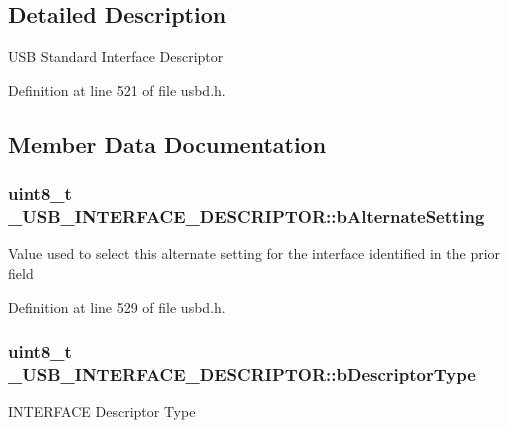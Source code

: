 \subsection{Detailed Description}
U\+SB Standard Interface Descriptor 

Definition at line 521 of file usbd.\+h.



\subsection{Member Data Documentation}
\subsubsection[{\texorpdfstring{b\+Alternate\+Setting}{bAlternateSetting}}]{\setlength{\rightskip}{0pt plus 5cm}uint8\+\_\+t \+\_\+\+U\+S\+B\+\_\+\+I\+N\+T\+E\+R\+F\+A\+C\+E\+\_\+\+D\+E\+S\+C\+R\+I\+P\+T\+O\+R\+::b\+Alternate\+Setting}\hypertarget{struct__USB__INTERFACE__DESCRIPTOR_aa596036a18b317c3dbeb9ea417938a43}{}\label{struct__USB__INTERFACE__DESCRIPTOR_aa596036a18b317c3dbeb9ea417938a43}
Value used to select this alternate setting for the interface identified in the prior field 

Definition at line 529 of file usbd.\+h.

\subsubsection[{\texorpdfstring{b\+Descriptor\+Type}{bDescriptorType}}]{\setlength{\rightskip}{0pt plus 5cm}uint8\+\_\+t \+\_\+\+U\+S\+B\+\_\+\+I\+N\+T\+E\+R\+F\+A\+C\+E\+\_\+\+D\+E\+S\+C\+R\+I\+P\+T\+O\+R\+::b\+Descriptor\+Type}\hypertarget{struct__USB__INTERFACE__DESCRIPTOR_a37b3f11033507a50c072cefb0000a8f4}{}\label{struct__USB__INTERFACE__DESCRIPTOR_a37b3f11033507a50c072cefb0000a8f4}
I\+N\+T\+E\+R\+F\+A\+CE Descriptor Type 

